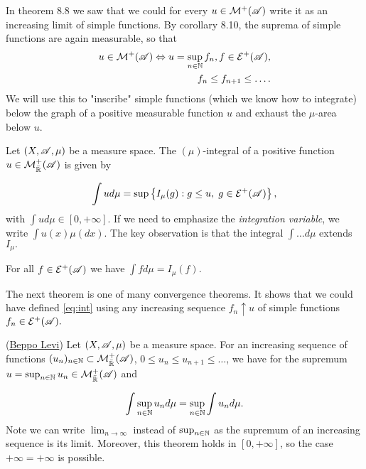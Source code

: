 In theorem 8.8 we saw that we could for every $u\in\mathcal{M}^+(\mathscr{A})$ write it as an increasing limit
of simple functions. By corollary 8.10, the suprema of simple functions are again measurable, so that 
\begin{align*}
    u\in\mathcal{M}^+(\mathscr{A})\Leftrightarrow u=\sup_{n\in\mathbb{N}} f_n, f\in\mathcal{E}^+(\mathscr{A}), \\f_n\leq f_{n+1}\leq\ldots.
\end{align*}
We will use this to "inscribe" simple functions (which we know how to integrate) below the graph of a 
positive measurable function $u$ and exhaust the $\mu$-area below $u$.
\begin{definition}
    Let $(X,\mathscr{A},\mu)$ be a measure space. The $(\mu)$-integral of a positive function $u\in\mathcal{M}_{\bar{\mathbb{R}}}^+(\mathscr{A})$ is given by 

    \begin{equation}
        \label{eq:int}
        \int ud\mu=\sup\left\{ I_\mu(g):g\leq u,\hspace{1mm} g\in\mathcal{E}^+(\mathscr{A}) \right\},
    \end{equation}
    with \(\int ud\mu\in[0,+\infty]\).
    If we need to emphasize the \textit{integration variable}, we write $\int u(x)\mu(dx).$
    The key observation is that the integral $\int\ldots d\mu$ extends $I_\mu.$

\end{definition}
\begin{lemma}
    For all $f\in\mathcal{E}^+(\mathscr{A})$ we have $\int fd\mu = I_\mu(f).$
\end{lemma}

The next theorem is one of many convergence theorems. It shows that we could have defined \ref*{eq:int} using any increasing
sequence $f_n\uparrow u$ of simple functions $f_n\in\mathcal{E}^+(\mathscr{A}).$

\begin{theorem}(\underline{Beppo Levi})
    Let $(X,\mathscr{A},\mu)$ be a measure space. For an increasing sequence of functions 
    $(u_n)_{n\in\mathbb{N}}\subset \mathcal{M}_{\bar{\mathbb{R}}}^+(\mathscr{A})$, $0\leq u_n\leq u_{n+1}\leq\ldots$, we have for the supremum $u=\sup_{n\in\mathbb{N}} u_n\in\mathcal{M}_{\bar{\mathbb{R}}}^+(\mathscr{A})$
    and 

    \begin{align}
        \int \sup_{n\in\mathbb{N}} u_nd\mu =\sup_{n\in\mathbb{N}} \int  u_nd\mu.
    \end{align}
Note we can write $\lim_{n\rightarrow \infty}$ instead of $\sup_{n\in\mathbb{N}}$ as the supremum of an increasing sequence
is its limit. Moreover, this theorem holds in $[0,+\infty]$, so the case $+\infty = +\infty$ is possible. 
\end{theorem}

